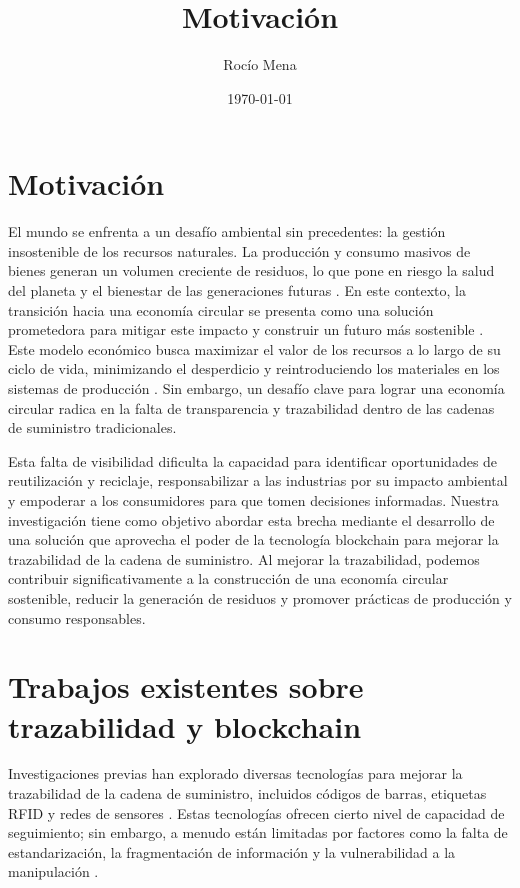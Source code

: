 \documentclass[main.tex]{subfiles}
\title{Motivación}
\author{Rocío Mena}
\date{\today}
\begin{document}
\maketitle

\section{Motivación}

El mundo se enfrenta a un desafío ambiental sin precedentes: la gestión insostenible de los recursos naturales. La producción y consumo masivos de bienes generan un volumen creciente de residuos, lo que pone en riesgo la salud del planeta y el bienestar de las generaciones futuras \cite{IPCC2022, pelegri2021ipcc}. En este contexto, la transición hacia una economía circular se presenta como una solución prometedora para mitigar este impacto y construir un futuro más sostenible \cite{clima2022book}. Este modelo económico busca maximizar el valor de los recursos a lo largo de su ciclo de vida, minimizando el desperdicio y reintroduciendo los materiales en los sistemas de producción \cite{da2022economia, melendez2021economia}. Sin embargo, un desafío clave para lograr una economía circular radica en la falta de transparencia y trazabilidad dentro de las cadenas de suministro tradicionales.

Esta falta de visibilidad dificulta la capacidad para identificar oportunidades de reutilización y reciclaje, responsabilizar a las industrias por su impacto ambiental y empoderar a los consumidores para que tomen decisiones informadas. Nuestra investigación tiene como objetivo abordar esta brecha mediante el desarrollo de una solución que aprovecha el poder de la tecnología blockchain para mejorar la trazabilidad de la cadena de suministro. Al mejorar la trazabilidad, podemos contribuir significativamente a la construcción de una economía circular sostenible, reducir la generación de residuos y promover prácticas de producción y consumo responsables.

\section{Trabajos existentes sobre trazabilidad y blockchain}

Investigaciones previas han explorado diversas tecnologías para mejorar la trazabilidad de la cadena de suministro, incluidos códigos de barras, etiquetas RFID y redes de sensores \cite{schuitemaker2020product}. Estas tecnologías ofrecen cierto nivel de capacidad de seguimiento; sin embargo, a menudo están limitadas por factores como la falta de estandarización, la fragmentación de información y la vulnerabilidad a la manipulación \cite{schuitemaker2020product}.
\end{document}
